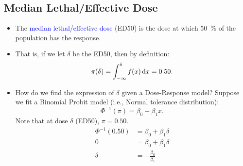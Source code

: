 \documentclass[oneside]{book}\usepackage[]{graphicx}\usepackage[svgnames]{xcolor}
\begin{document}
\subsection*{Median Lethal/Effective Dose}
\begin{itemize}
      \item The \textcolor{Blue}{median lethal/effective dose} (ED50) is the dose at which \qty{50}{\percent} of the
            population has the response.
      \item That is, if we let $ \delta $ be the ED50, then by definition:
            \[ \pi(\delta)=\int_{-\infty}^{\delta}f(x)\odif{x} =0.50. \]
      \item How do we find the expression of $ \delta $ given a Dose-Response model? Suppose we fit a Binomial Probit model (i.e., Normal tolerance distribution):
            \[ \Phi^{-1}(\pi)=\beta_0+\beta_1x. \]
            Note that at dose $ \delta $ (ED50), $ \pi=0.50 $.
            \begin{align*}
                  \Phi^{-1}(0.50) & =\beta_0+\beta_1\delta    \\
                  0               & =\beta_0+\beta_1\delta    \\
                  \delta          & =-\frac{\beta_0}{\beta_1}
            \end{align*}
\end{itemize}
\end{document}
